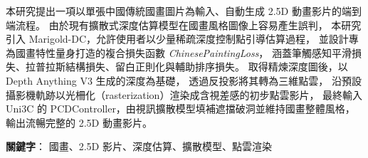 本研究提出一項以單張中國傳統國畫圖片為輸入、自動生成 2.5D 動畫影片的端到端流程。
由於現有擴散式深度估算模型在國畫風格圖像上容易產生誤判，
本研究引入 Marigold-DC，允許使用者以少量稀疏深度控制點引導估算過程，
並設計專為國畫特性量身打造的複合損失函數 \textit{ChinesePaintingLoss}，
涵蓋筆觸感知平滑損失、拉普拉斯結構損失、留白正則化與輔助排序損失。
取得精煉深度圖後，以 Depth Anything V3 生成的深度為基礎，
透過反投影將其轉為三維點雲，
沿預設攝影機軌跡以光柵化（rasterization）渲染成含視差感的初步點雲影片，
最終輸入 Uni3C 的 PCDController，由視訊擴散模型填補遮擋破洞並維持國畫整體風格，
輸出流暢完整的 2.5D 動畫影片。

\begin{flushleft}
{\bf 關鍵字}： 國畫、2.5D 影片、深度估算、擴散模型、點雲渲染
\end{flushleft}
